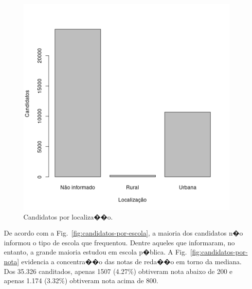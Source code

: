 \documentclass[12pt]{article}
\newcommand{\reffig}[1]{Fig.~\ref{fig:#1}}
\begin{document}
\begin{minipage}{.5\textwidth}
    \begin{figure}[H]
    \includegraphics[width=\linewidth]{../geral_candidatos-por-localizacao.png}
    \caption{Candidatos por localiza��o.}
    \label{fig:candidatos-por-localizacao}
    \end{figure}
\end{minipage}


\vspace{1cm}
De acordo com a \reffig{candidatos-por-escola}, a maioria dos candidatos n�o informou o tipo de escola que frequentou.
Dentre aqueles que informaram, no entanto, a grande maioria estudou em escola p�blica.
A \reffig{candidatos-por-nota} evidencia a concentra��o das notas de reda��o em torno da mediana.
Dos 35.326 canditados, apenas 1507 (4.27\%) obtiveram nota abaixo de 200 e apenas 1.174 (3.32\%) obtiveram nota acima de 800.
\end{document}
